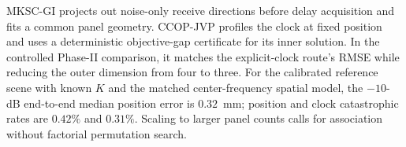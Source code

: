 \documentclass[letterpaper,journal]{IEEEtran}
\begin{document}
MKSC-GI projects out noise-only receive directions before delay acquisition
and fits a common panel geometry. CCOP-JVP profiles the clock at fixed
position and uses a deterministic objective-gap certificate for its inner
solution. In
the controlled Phase-II comparison, it matches the explicit-clock route's
RMSE while reducing the outer dimension from four to three. For the
calibrated reference scene with known $K$ and the matched center-frequency
spatial model, the $-10$-dB end-to-end median position error is $0.32$~mm;
position and clock catastrophic rates are $0.42\%$ and $0.31\%$. Scaling to
larger panel counts calls for association without factorial permutation
search.



\end{document}
